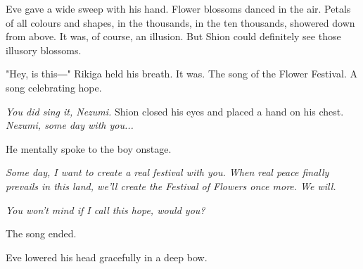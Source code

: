 Eve gave a wide sweep with his hand. Flower blossoms danced in the air. Petals of all colours and shapes, in the thousands, in the ten thousands, showered down from above. It was, of course, an illusion. But Shion could definitely see those illusory blossoms.


"Hey, is this―" Rikiga held his breath. It was. The song of the Flower Festival. A song celebrating hope.

\emph{You did sing it, Nezumi.} Shion closed his eyes and placed a hand on his chest. \emph{Nezumi, some day with you...}

He mentally spoke to the boy onstage.

\emph{Some day, I want to create a real festival with you. When real peace finally prevails in this land, we'll create the Festival of Flowers once more. We will.}

\emph{You won't mind if I call this hope, would you?}

The song ended.

Eve lowered his head gracefully in a deep bow.